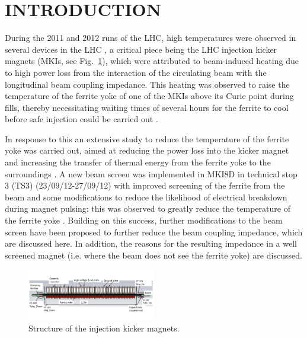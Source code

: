 \documentclass{JAC2003}
\begin{document}
% 

\section{INTRODUCTION}

During the 2011 and 2012 runs of the LHC, high temperatures were observed in several devices in the LHC  \cite{metral_cham2012}, a critical piece being the LHC injection kicker magnets (MKIs, see Fig.~\ref{fig:mkiStruct}), which were attributed to beam-induced heating due to high power loss from the interaction of the circulating beam with the longitudinal beam coupling impedance. This heating was observed to raise the temperature of the ferrite yoke of one of the MKIs above its Curie point during fills, thereby necessitating waiting times of several hours for the ferrite to cool before safe injection could be carried out \cite{mki-heating}. 

In response to this an extensive study to reduce the temperature of the ferrite yoke was carried out, aimed at reducing the power loss into the kicker magnet and increasing the transfer of thermal energy from the ferrite yoke to the surroundings \cite{mki-heatingTemp}. A new beam screen was implemented in MKI8D in technical stop 3 (TS3) (23/09/12-27/09/12) with improved screening of the ferrite from the beam and some modifications to reduce the likelihood of electrical breakdown during magnet pulsing: this was observed to greatly reduce the temperature of the ferrite yoke \cite{mki-heatingTemp}. Building on this success, further modifications to the beam screen have been proposed to further reduce the beam coupling impedance, which are discussed here. In addition, the reasons for the resulting impedance in a well screened magnet (i.e. where the beam does not see the ferrite yoke) are discussed. 

\begin{figure}
\includegraphics[width=0.5\textwidth]{MKICrossSectionYZ.pdf}
\caption{Structure of the injection kicker magnets.}
\label{fig:mkiStruct}
\end{figure}
\end{document}
